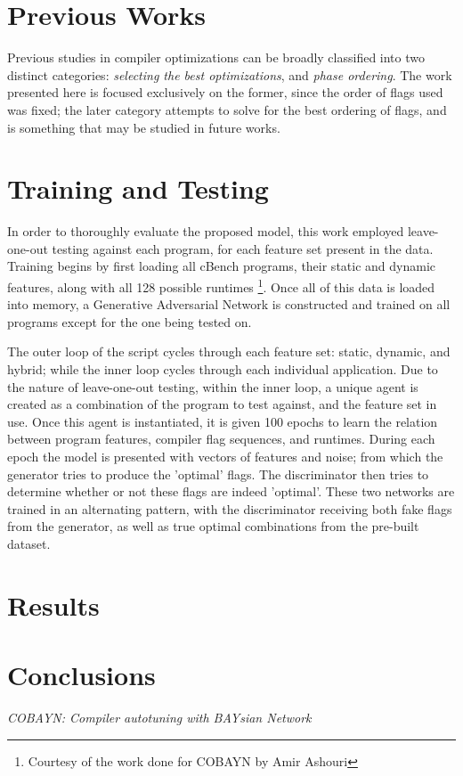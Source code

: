 \documentclass{article}
\begin{document}
\section{Previous Works}
Previous studies in compiler optimizations can be broadly classified into two distinct categories: \textit{selecting the best optimizations}, and \textit{phase ordering}. The work presented here is focused exclusively on the former, since the order of flags used was fixed; the later category attempts to solve for the best ordering of flags, and is something that may be studied in future works. 

\section{Training and Testing}
In order to thoroughly evaluate the proposed model, this work employed leave-one-out testing against each program, for each feature set present in the data. Training begins by first loading all cBench programs, their static and dynamic features, along with all 128 possible runtimes \footnote{Courtesy of the work done for COBAYN by Amir Ashouri}. Once all of this data is loaded into memory, a Generative Adversarial Network is constructed and trained on all programs except for the one being tested on.

The outer loop of the script cycles through each feature set: static, dynamic, and hybrid; while the inner loop cycles through each individual application. Due to the nature of leave-one-out testing, within the inner loop, a unique agent is created as a combination of the program to test against, and the feature set in use. Once this agent is instantiated, it is given 100 epochs to learn the relation between program features, compiler flag sequences, and runtimes. During each epoch the model is presented with vectors of features and noise; from which the generator tries to produce the 'optimal' flags. The discriminator then tries to determine whether or not these flags are indeed 'optimal'. These two networks are trained in an alternating pattern, with the discriminator receiving both fake flags from the generator, as well as true optimal combinations from the pre-built dataset.

\section{Results}


\section{Conclusions}



\begin{thebibliography}{9}
 \emph{COBAYN: Compiler autotuning with BAYsian Network}
\end{thebibliography}
\end{document}
